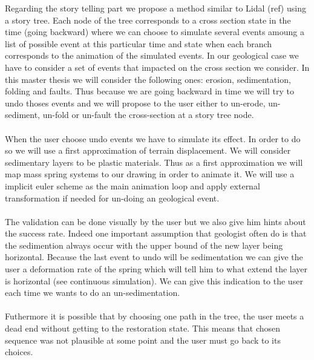 \documentclass[12pt, a4paper]{memoir} %
\begin{document}
Regarding the story telling part we propose a method similar to Lidal (ref) using a story tree. Each node of the tree corresponds to a cross section state in the time (going backward) where we can choose to simulate several events amoung a list of possible event at this particular time and state when each branch corresponds to the animation of the simulated events.
In our geological case we have to consider a set of events that impacted on the cross section we consider. In this master thesis we will consider the following ones: erosion, sedimentation, folding and faults. Thus because we are going backward in time we will try to undo thoses events and we will propose to the user either to un-erode, un-sediment, un-fold or un-fault the cross-section at a story tree node. \\\\


When the user choose undo events we have to simulate its effect. In order to do so we will use a first approximation of terrain displacement. We will consider sedimentary layers to be plastic materials. Thus as a first approximation we will map mass spring systems to our drawing in order to animate it. We will use a implicit euler scheme as the main animation loop and apply external transformation if needed for un-doing an geological event.\\\\

The validation can be done visually by the user but we also give him hints about the success rate. Indeed one important assumption that geologist often do is that the sedimention always occur with the upper bound of the new layer being horizontal. Because the last event to undo will be sedimentation we can give the user a deformation rate of the spring which will tell him to what extend the layer is horizontal (see continuous simulation). We can give this indication to the user each time we wants to do an un-sedimentation.\\\\

Futhermore it is possible that by choosing one path in the tree, the user meets a dead end without getting to the restoration state. This means that chosen sequence was not plausible at some point and the user must go back to its choices.\\\\
\end{document}
